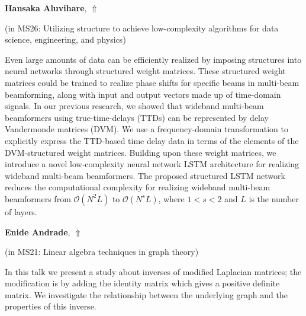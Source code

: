 \documentclass[ILAS2025-program.tex]{subfiles}
\begin{document}
     \hypertarget{down0059}{}\begin{ilasabstract}
    
    \textbf{Hansaka Aluvihare},  \hfill \hyperlink{up0059}{$\Uparrow$}
    
    (in {\color{mstitle}MS26: Utilizing structure to achieve low-complexity algorithms for data science, engineering, and physics})
        
        \mtskip
    Even large amounts of data can be efficiently realized by imposing structures into neural networks through structured weight matrices. These structured weight matrices could be trained to realize phase shifts for specific beams in multi-beam beamforming, along with input and output vectors made up of time-domain signals. In our previous research, we showed that wideband multi-beam beamformers using true-time-delays (TTDs) can be represented by delay Vandermonde matrices (DVM). We use a frequency-domain transformation to explicitly express the TTD-based time delay data in terms of the elements of the DVM-structured weight matrices. Building upon these weight matrices, we introduce a novel low-complexity neural network LSTM architecture for realizing wideband multi-beam beamformers. The proposed structured LSTM network reduces the computational complexity for realizing wideband multi-beam beamformers from $\mathcal{O}(N^2L)$ to $\mathcal{O}(N^sL)$, where $1 < s < 2$ and $L$ is the number of layers.
\end{ilasabstract}
     \hypertarget{down0170}{}\begin{ilasabstract}
    
    \textbf{Enide Andrade},  \hfill \hyperlink{up0170}{$\Uparrow$}
    
    (in {\color{mstitle}MS21: Linear algebra techniques in graph theory})
        
        \mtskip
    In this talk we present a study about inverses of modified Laplacian matrices; the modification is by adding the
identity matrix which gives a positive definite matrix. We investigate the relationship between
the underlying graph and the properties of this inverse. 




\end{ilasabstract}
\end{document}
